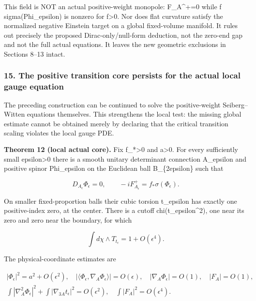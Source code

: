 \documentclass[
  10pt,
]{article}
\begin{document}
This field is NOT an actual positive-weight monopole: F\_A\^{}+=0 while
f sigma(Phi\_epsilon) is nonzero for f\textgreater0. Nor does flat
curvature satisfy the normalized negative Einstein target on a global
fixed-volume manifold. It rules out precisely the proposed
Dirac-only/null-form deduction, not the zero-end gap and not the full
actual equations. It leaves the new geometric exclusions in Sections
8--13 intact.

\hypertarget{the-positive-transition-core-persists-for-the-actual-local-gauge-equation}{%
\subsubsection{15. The positive transition core persists for the actual
local gauge
equation}\label{the-positive-transition-core-persists-for-the-actual-local-gauge-equation}}

The preceding construction can be continued to solve the positive-weight
Seiberg--Witten equations themselves. This strengthens the local test:
the missing global estimate cannot be obtained merely by declaring that
the critical transition scaling violates the local gauge PDE.

\textbf{Theorem 12 (local actual core).} Fix f\_*\textgreater0 and
a\textgreater0. For every sufficiently small epsilon\textgreater0 there
is a smooth unitary determinant connection A\_epsilon and positive
spinor Phi\_epsilon on the Euclidean ball B\_\{2epsilon\} such that

\[
 D_{A_\epsilon}\Phi_\epsilon=0,\qquad
       -iF_{A_\epsilon}^+=f_*\sigma(\Phi_\epsilon).
                                                               \tag{15.1}
\]

On smaller fixed-proportion balls their cubic torsion t\_epsilon has
exactly one positive-index zero, at the center. There is a cutoff
chi(\textbar t\_epsilon\textbar\^{}2), one near its zero and zero near
the boundary, for which

\[
 \int d\chi\wedge T_{t_\epsilon}=1+O(\epsilon^4).      \tag{15.2}
\]

The physical-coordinate estimates are

\[
\begin{gathered}
 |\Phi_\epsilon|^2=a^2+O(\epsilon^2),\quad
 |\langle\Phi_\epsilon,\nabla_A\Phi_\epsilon\rangle|=O(\epsilon),
 \quad |\nabla_A\Phi_\epsilon|=O(1),\quad |F_A|=O(1),\\
 \int|\nabla_A^2\Phi_\epsilon|^2+
       \int|\nabla_{3A}t_\epsilon|^2=O(\epsilon^2),\quad
 \int|F_A|^2=O(\epsilon^4).
\end{gathered}                                                     \tag{15.3}
\]
\end{document}
